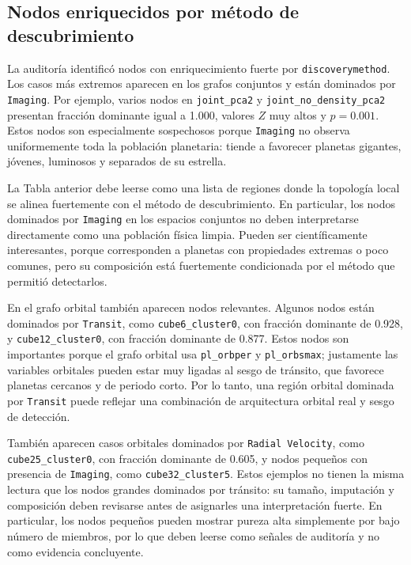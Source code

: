 \subsection*{Nodos enriquecidos por método de descubrimiento}

La auditoría identificó nodos con enriquecimiento fuerte por \texttt{discoverymethod}. Los casos más extremos aparecen en los grafos conjuntos y están dominados por \texttt{Imaging}. Por ejemplo, varios nodos en \texttt{joint\_pca2} y \texttt{joint\_no\_density\_pca2} presentan fracción dominante igual a 1.000, valores \(Z\) muy altos y \(p=0.001\). Estos nodos son especialmente sospechosos porque \texttt{Imaging} no observa uniformemente toda la población planetaria: tiende a favorecer planetas gigantes, jóvenes, luminosos y separados de su estrella.



La Tabla anterior debe leerse como una lista de regiones donde la topología local se alinea fuertemente con el método de descubrimiento. En particular, los nodos dominados por \texttt{Imaging} en los espacios conjuntos no deben interpretarse directamente como una población física limpia. Pueden ser científicamente interesantes, porque corresponden a planetas con propiedades extremas o poco comunes, pero su composición está fuertemente condicionada por el método que permitió detectarlos.

En el grafo orbital también aparecen nodos relevantes. Algunos nodos están dominados por \texttt{Transit}, como \texttt{cube6\_cluster0}, con fracción dominante de 0.928, y \texttt{cube12\_cluster0}, con fracción dominante de 0.877. Estos nodos son importantes porque el grafo orbital usa \texttt{pl\_orbper} y \texttt{pl\_orbsmax}; justamente las variables orbitales pueden estar muy ligadas al sesgo de tránsito, que favorece planetas cercanos y de periodo corto. Por lo tanto, una región orbital dominada por \texttt{Transit} puede reflejar una combinación de arquitectura orbital real y sesgo de detección.

También aparecen casos orbitales dominados por \texttt{Radial Velocity}, como \texttt{cube25\_cluster0}, con fracción dominante de 0.605, y nodos pequeños con presencia de \texttt{Imaging}, como \texttt{cube32\_cluster5}. Estos ejemplos no tienen la misma lectura que los nodos grandes dominados por tránsito: su tamaño, imputación y composición deben revisarse antes de asignarles una interpretación fuerte. En particular, los nodos pequeños pueden mostrar pureza alta simplemente por bajo número de miembros, por lo que deben leerse como señales de auditoría y no como evidencia concluyente.

